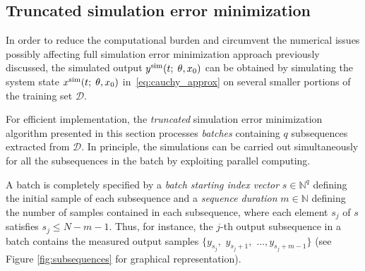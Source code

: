 \documentclass{article} %
\newcommand{\batchsize}{q}
\newcommand{\seqlen}{m}
\newcommand{\nsamp}{N}
\newcommand{\Did}{{\mathcal{D}}}
\newcommand{\simul}[1]{{#1}^{\rm sim}}
\newcommand{\est}{}
\begin{document}
\subsection{Truncated simulation error minimization}
In order to reduce the computational burden {and circumvent the numerical issues possibly affecting} full simulation error minimization approach previously discussed,  
the simulated output $\simul{\est{y}}(t;\;\theta, x_0)$ can be obtained by simulating the system state $\simul{x}(t;\; \theta, x_0)$ in~\eqref{eq:cauchy_approx} on several smaller portions of the training set $\Did$.  

 For efficient implementation, the \emph{truncated} simulation error minimization algorithm presented in this section  processes \emph{batches} containing $\batchsize$ subsequences extracted from $\Did$. In principle, the simulations can be carried out simultaneously for all the subsequences in the batch by exploiting parallel computing. 



A batch is completely specified by a \emph{batch starting index vector} ${s} \in \mathbb{N}^{\batchsize}$ defining the initial sample of each subsequence and a \emph{sequence duration} ${\seqlen} \in \mathbb{N}$ defining the number of  samples contained in each subsequence, where each element $s_j$ of $s$ satisfies $s_j\leq \nsamp - \seqlen - 1$. Thus, for instance, the $j$-th output subsequence in a batch contains the measured output samples $\{y_{s_j},$ $y_{s_j+1},$ $\dots, y_{s_j+\seqlen-1}\}$ %
(see Figure \ref{fig:subsequences} for graphical representation).
\end{document}
